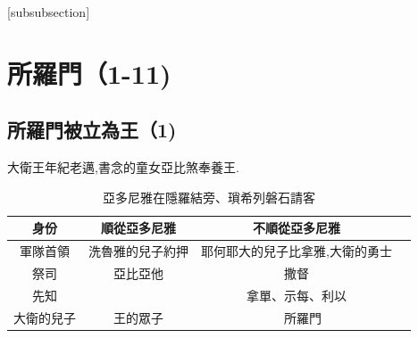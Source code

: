 \documentclass{ctexart}
\begin{document}
[subsubsection]
\def\subsubsubsectionmark#1{}
\def\thesubsubsubsection {\thesubsubsection 
      .\arabic{subsubsubsection}}
\def\subsubsubsection{\@startsection
      {subsubsubsection}{4}{\z@} {-3.25ex plus -1
      ex minus -.2ex}{1.5ex plus .2ex}{\normalsize\bf}}
\def\l@subsubsubsection{\@dottedtocline{4}{4.8em}
      {4.2em}}
      
\renewcommand{\paragraph}{\@startsection{paragraph}{4}{0ex}%
    {-3.25ex plus -1ex minus -0.2ex}%
    {1.5ex plus 0.2ex}%
    {\normalfont\normalsize\bfseries}}
\makeatother      
\tableofcontents
\thispagestyle{empty}
\listoffigures
\thispagestyle{empty}
\listoftables
\thispagestyle{empty}


\let\origdescription\description
\renewenvironment{description}{
  \setlength{\leftmargini}{5em}
  \origdescription
  \setlength{\itemindent}{5em}
  \setlength{\labelsep}{\textwidth}
}
{\endlist}


\pagestyle{fancy}  

\maketitle 




\section{所羅門（1-11)}

\subsection{所羅門被立為王（1)}
大衛王年紀老邁,書念的童女亞比煞奉養王.
\begin{table}[!hbp]
\centering
\begin{tabular}{|c|c|c|c|}
\hline
\hline
 身份 &順從亞多尼雅    &  不順從亞多尼雅\\\hline\hline
 軍隊首領&洗魯雅的兒子約押 &耶何耶大的兒子比拿雅,大衛的勇士 \\\hline
祭司   & 亞比亞他&撒督 \\\hline
先知& & 拿單、示每、利以  \\\hline
大衛的兒子 &王的眾子&　所羅門\\\hline
\end{tabular}
\caption{亞多尼雅在隱羅結旁、瑣希列磐石請客}
\end{table}
\end{document}

